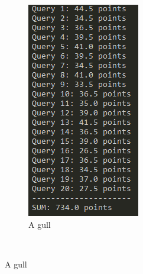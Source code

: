 \begin{figure}[h]
    \centering
    \begin{subfigure}[b]{0.3\textwidth}
        \includegraphics[width=\textwidth]{fig/results_smart.PNG}
        \caption{A gull}
        \label{fig:gull}
    \end{subfigure}
    ~ %

\end{figure}
